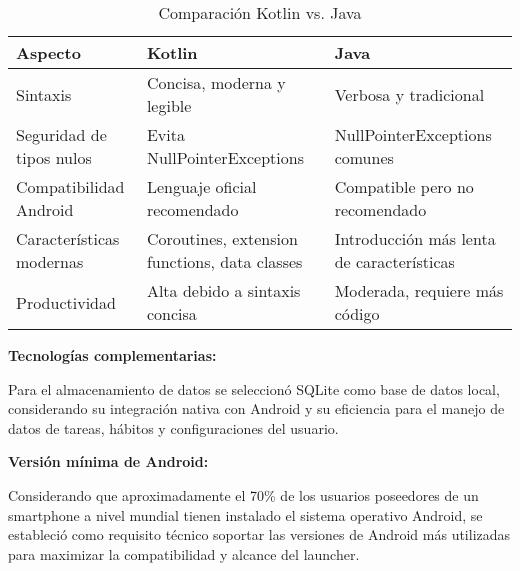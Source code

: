 \begin{table}[H]
\centering
\caption{Comparación Kotlin vs. Java}
\begin{tabular}{|p{}|p{}|p{}|}
\hline
\textbf{Aspecto} & \textbf{Kotlin} & \textbf{Java} \\
\hline
Sintaxis & Concisa, moderna y legible & Verbosa y tradicional \\
\hline
Seguridad de tipos nulos & Evita NullPointerExceptions & NullPointerExceptions comunes \\
\hline
Compatibilidad Android & Lenguaje oficial recomendado & Compatible pero no recomendado \\
\hline
Características modernas & Coroutines, extension functions, data classes & Introducción más lenta de características \\
\hline
Productividad & Alta debido a sintaxis concisa & Moderada, requiere más código \\
\hline
\end{tabular}
\end{table}

\textbf{Tecnologías complementarias:}

Para el almacenamiento de datos se seleccionó SQLite como base de datos local, considerando su integración nativa con Android y su eficiencia para el manejo de datos de tareas, hábitos y configuraciones del usuario.

\textbf{Versión mínima de Android:}

Considerando que aproximadamente el 70\% de los usuarios poseedores de un smartphone a nivel mundial tienen instalado el sistema operativo Android, se estableció como requisito técnico soportar las versiones de Android más utilizadas para maximizar la compatibilidad y alcance del launcher.